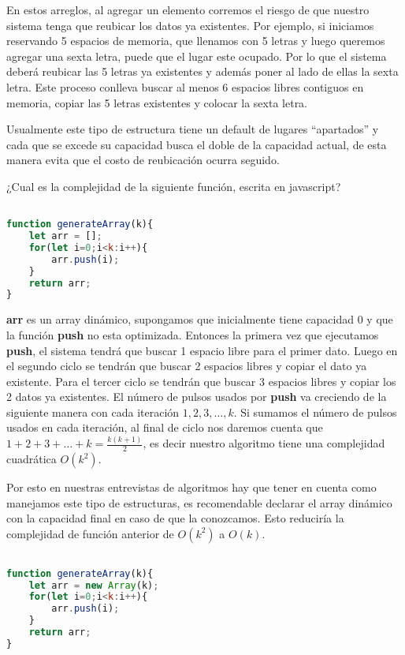 En estos arreglos, al agregar un elemento corremos el riesgo de que nuestro sistema tenga que reubicar los datos ya existentes. Por ejemplo, si iniciamos reservando 5 espacios de memoria, que llenamos con 5 letras y luego queremos agregar una sexta letra, puede que el lugar este ocupado. Por lo que el sistema deberá reubicar las 5 letras ya existentes y además poner al lado de ellas la sexta letra. Este proceso conlleva buscar al menos 6 espacios libres contiguos en memoria, copiar las 5 letras existentes y colocar la sexta letra. 

Usualmente este tipo de estructura tiene un default de lugares ``apartados'' y cada que se excede su capacidad busca el doble de la capacidad actual, de esta manera evita que el costo de reubicación ocurra seguido. 

¿Cual es la complejidad de la siguiente función, escrita en javascript?

\begin{lstlisting}[language=JavaScript, caption=Genera array]

function generateArray(k){
    let arr = [];
    for(let i=0;i<k:i++){
        arr.push(i);
    }
    return arr;
}
\end{lstlisting}

\textbf{arr} es un array dinámico, supongamos que inicialmente tiene capacidad 0 y que la función \textbf{push} no esta optimizada. Entonces la primera vez que ejecutamos \textbf{push}, el sistema tendrá que buscar 1 espacio libre para el primer dato. Luego en el segundo ciclo se tendrán que buscar 2 espacios libres y copiar el dato ya existente. Para el tercer ciclo se tendrán que buscar 3 espacios libres y copiar los 2 datos ya existentes. El número de pulsos usados por \textbf{push} va creciendo de la siguiente manera con cada iteración $1,2,3,\dots,k$. Si sumamos el número de pulsos usados en cada iteración, al final de ciclo nos daremos cuenta que $1+2+3+\dots+k = \frac{k(k+1)}{2}$, es decir nuestro algoritmo tiene una complejidad cuadrática $O(k^2)$. 

Por esto en nuestras entrevistas de algoritmos hay que tener en cuenta como manejamos este tipo de estructuras, es recomendable declarar el array dinámico con la capacidad final en caso de que la conozcamos. Esto reduciría la complejidad de función anterior de $O(k^2)$ a $O(k)$.


\begin{lstlisting}[language=JavaScript, caption=Genera array  con complejidad lineal]

function generateArray(k){
    let arr = new Array(k);
    for(let i=0;i<k:i++){
        arr.push(i);
    }
    return arr;
}
\end{lstlisting}

